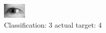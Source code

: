 \begin{figure}[h!]
\begin{center}
\includegraphics[width=0.60\columnwidth]{figures/ID3198_class_3_target_4.png}
\end{center}
\caption{ Classification: 3 actual target: 4}
\label{fig:ID3198_class_3_target_4}
\end{figure}
